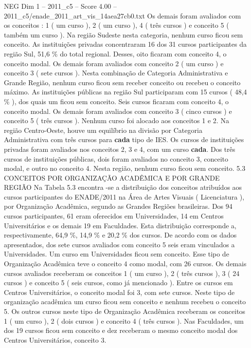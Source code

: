 \begin{textsample}{NEG Dim 1 – 2011\_c5 – Score 4.00 – 2011\_c5/enade\_2011\_art\_vis\_14aea27cb0.txt}
Os demais foram avaliados com os conceitos : 1 ( um curso ), 2 ( um curso ), 4 ( três cursos ) e conceito 5 ( também um curso ).
Na região Sudeste nesta categoria, nenhum curso ficou sem conceito.
As instituições privadas concentraram 16 dos 31 cursos participantes da região Sul, 51,6 \% do total regional.
Desses, oito ficaram com conceito 4, o conceito modal.
Os demais foram avaliados com conceito 2 ( um curso ) e conceito 3 ( sete cursos ).
Nesta combinação de Categoria Administrativa e Grande Região, nenhum curso ficou sem receber conceito ou recebeu o conceito máximo.
As instituições públicas na região Sul participaram com 15 cursos ( 48,4 \% ), dos quais um ficou sem conceito.
Seis cursos ficaram com conceito 4, o conceito modal.
Os demais foram avaliados com conceito 3 ( cinco cursos ) e conceito 5 ( três cursos ).
Nenhum curso foi alocado aos conceitos 1 e 2.
Na região Centro-Oeste, houve um equilíbrio na divisão por Categoria Administrativa com três cursos para \textbf{cada} tipo de IES.
Os cursos de instituições privadas foram avaliados nos conceitos 2, 3 e 4, com um curso \textbf{cada}.
Dos três cursos de instituições públicas, dois foram avaliados no conceito 3, conceito modal, e outro no conceito 4.
Nesta região, nenhum curso ficou sem conceito. 5.3 CONCEITOS POR ORGANIZAÇÃO ACADÊMICA E POR GRANDE REGIÃO Na Tabela 5.3 encontra -se a distribuição dos conceitos atribuídos aos cursos participantes do ENADE/2011 na Área de Artes Visuais ( Licenciatura ), por Organização Acadêmica, segundo as Grandes Regiões brasileiras.
Dos 94 cursos participantes, 61 eram oferecidos em Universidades, 14 em Centros Universitários e os demais 19 em Faculdades.
Esta distribuição corresponde a, respectivamente, 64,9 \%, 14,9 \% e 20,2 \% dos cursos.
De acordo com os dados apresentados, dos sete cursos avaliados com conceito 5 seis eram vinculados a Universidades.
Um curso em Universidades ficou sem conceito.
Esse tipo de Organização Acadêmica teve o conceito 4 como modal, com 26 cursos.
Os demais cursos avaliados receberam os conceitos 1 ( um curso ), 2 ( três cursos ), 3 ( 24 cursos ) e conceito 5 ( seis cursos, como já mencionado ).
Entre os cursos em Centros Universitários, o conceito modal foi 3, com sete cursos.
Neste tipo de organização acadêmica um curso ficou sem conceito e nenhum recebeu o conceito 5.
Os outros cursos neste tipo de Organização Acadêmica receberam os conceitos 1 ( um curso ), 2 ( dois cursos ) e conceito 4 ( três cursos ).
Nas Faculdades, um dos 19 cursos ficou sem conceito e dez receberam o mesmo conceito modal dos Centros Universitários, conceito 3.

\end{textsample}

